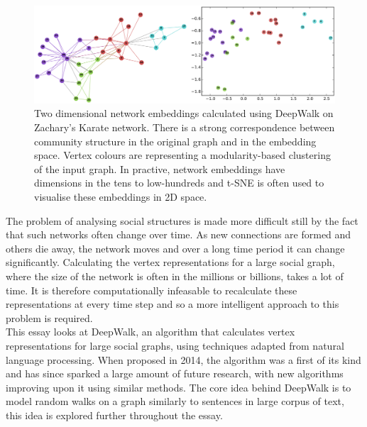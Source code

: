 \documentclass[a4paper]{article}
\begin{document}
\begin{figure}[h!]
  \centering
  \includegraphics[width = 1\textwidth]{src/DeepWalkOnKarateGraph.png}

  \caption{Two dimensional network embeddings calculated using
    DeepWalk on Zachary's Karate network\cite{zachary1977}. There is a strong
    correspondence between community structure in the original graph and
    in the embedding space. Vertex colours are representing a modularity-based
    clustering of the input graph. In practive, network embeddings have dimensions
    in the tens to low-hundreds and t-SNE is often used to visualise these embeddings in 2D
    space.\cite{maaten2008}}
\end{figure}
The problem of analysing social structures is made more difficult still by the
fact that such networks often change over time. As new connections are formed
and others die away, the network moves and over a long time period it can
change significantly. Calculating the vertex representations for a large social
graph, where the size of the network is often in the millions or billions, takes
a lot of time. It is therefore computationally infeasable to recalculate these
representations at every time step and so a more intelligent approach to this
problem is required.\\
This essay looks at DeepWalk, an algorithm that calculates vertex
representations for large social graphs, using techniques adapted from natural
language processing. When proposed in 2014, the algorithm was a first of its
kind and has since sparked a large amount of future research, with new
algorithms improving upon it using similar methods. The core idea behind
DeepWalk is to model random walks on a graph similarly to sentences in large
corpus of text, this idea is explored further throughout the essay.
\end{document}
